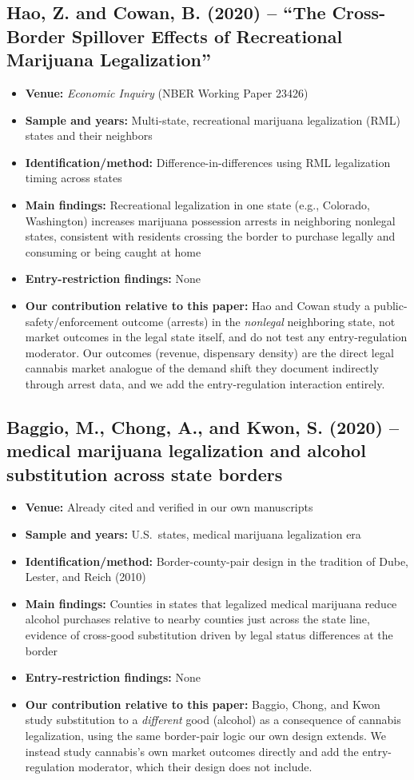 \documentclass[11pt]{article}
\begin{document}
\subsection{Hao, Z. and Cowan, B. (2020) -- ``The Cross-Border Spillover Effects of Recreational Marijuana
Legalization''}
\begin{itemize}
\item \textbf{Venue:} \emph{Economic Inquiry} (NBER Working Paper 23426)
\item \textbf{Sample and years:} Multi-state, recreational marijuana legalization (RML) states and their
neighbors
\item \textbf{Identification/method:} Difference-in-differences using RML legalization timing across states
\item \textbf{Main findings:} Recreational legalization in one state (e.g., Colorado, Washington) increases
marijuana possession arrests in neighboring nonlegal states, consistent with residents crossing the border to
purchase legally and consuming or being caught at home
\item \textbf{Entry-restriction findings:} None
\item \textbf{Our contribution relative to this paper:} Hao and Cowan study a public-safety/enforcement
outcome (arrests) in the \emph{nonlegal} neighboring state, not market outcomes in the legal state itself, and
do not test any entry-regulation moderator. Our outcomes (revenue, dispensary density) are the direct legal
cannabis market analogue of the demand shift they document indirectly through arrest data, and we add the
entry-regulation interaction entirely.
\end{itemize}

\subsection{Baggio, M., Chong, A., and Kwon, S. (2020) -- medical marijuana legalization and alcohol
substitution across state borders}
\begin{itemize}
\item \textbf{Venue:} Already cited and verified in our own manuscripts
\item \textbf{Sample and years:} U.S.\ states, medical marijuana legalization era
\item \textbf{Identification/method:} Border-county-pair design in the tradition of Dube, Lester, and Reich
(2010)
\item \textbf{Main findings:} Counties in states that legalized medical marijuana reduce alcohol purchases
relative to nearby counties just across the state line, evidence of cross-good substitution driven by legal
status differences at the border
\item \textbf{Entry-restriction findings:} None
\item \textbf{Our contribution relative to this paper:} Baggio, Chong, and Kwon study substitution to a
\emph{different} good (alcohol) as a consequence of cannabis legalization, using the same border-pair logic
our own design extends. We instead study cannabis's own market outcomes directly and add the entry-regulation
moderator, which their design does not include.
\end{itemize}
\end{document}
